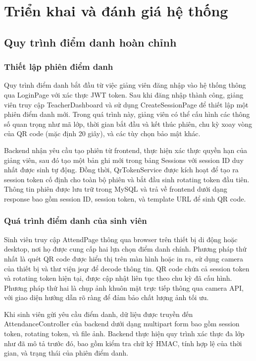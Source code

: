 \documentclass[12pt,a4paper]{report}
\begin{document}
\chapter{Triển khai và đánh giá hệ thống}
\section{Quy trình điểm danh hoàn chỉnh}
\subsection{Thiết lập phiên điểm danh}
Quy trình điểm danh bắt đầu từ việc giảng viên đăng nhập vào hệ thống thông qua LoginPage với xác thực JWT token. Sau khi đăng nhập thành công, giảng viên truy cập TeacherDashboard và sử dụng CreateSessionPage để thiết lập một phiên điểm danh mới. Trong quá trình này, giảng viên có thể cấu hình các thông số quan trọng như mã lớp, thời gian bắt đầu và kết thúc phiên, chu kỳ xoay vòng của QR code (mặc định 20 giây), và các tùy chọn bảo mật khác.

Backend nhận yêu cầu tạo phiên từ frontend, thực hiện xác thực quyền hạn của giảng viên, sau đó tạo một bản ghi mới trong bảng Sessions với session ID duy nhất được sinh tự động. Đồng thời, QrTokenService được kích hoạt để tạo ra session token cố định cho toàn bộ phiên và bắt đầu sinh rotating token đầu tiên. Thông tin phiên được lưu trữ trong MySQL và trả về frontend dưới dạng response bao gồm session ID, session token, và template URL để sinh QR code.

\subsection{Quá trình điểm danh của sinh viên}
Sinh viên truy cập AttendPage thông qua browser trên thiết bị di động hoặc desktop, nơi họ được cung cấp hai lựa chọn điểm danh chính. Phương pháp thứ nhất là quét QR code được hiển thị trên màn hình hoặc in ra, sử dụng camera của thiết bị và thư viện jsqr để decode thông tin. QR code chứa cả session token và rotating token hiện tại, được cập nhật liên tục theo chu kỳ đã cấu hình. Phương pháp thứ hai là chụp ảnh khuôn mặt trực tiếp thông qua camera API, với giao diện hướng dẫn rõ ràng để đảm bảo chất lượng ảnh tối ưu.

Khi sinh viên gửi yêu cầu điểm danh, dữ liệu được truyền đến AttendanceController của backend dưới dạng multipart form bao gồm session token, rotating token, và file ảnh. Backend thực hiện quy trình xác thực đa lớp như đã mô tả trước đó, bao gồm kiểm tra chữ ký HMAC, tính hợp lệ của thời gian, và trạng thái của phiên điểm danh.
\end{document}

